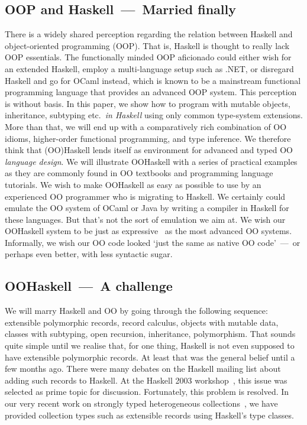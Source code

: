 
\subsection*{OOP and Haskell~---~Married finally}
There is a widely shared perception regarding the relation between
Haskell and object-oriented programming (OOP). That is, Haskell is
thought to really lack OOP essentials. The functionally minded OOP
aficionado could either wish for an extended Haskell, employ a
multi-language setup such as .NET, or disregard Haskell and go for
OCaml instead, which is known to be a mainstream functional
programming language that provides an advanced OOP system. This
perception is without basis. In this paper, we show how to program
with mutable objects, inheritance, subtyping etc.\ \emph{in Haskell}
using only common type-system extensions. More than that, we will end
up with a comparatively rich combination of OO idioms, higher-order
functional programming, and type inference. We therefore think that
(OO)Haskell lends itself as environment for advanced and typed OO
\emph{language design}. We will illustrate OOHaskell with a series of
practical examples as they are commonly found in OO textbooks and
programming language tutorials. We wish to make OOHaskell as easy as
possible to use by an experienced OO programmer who is migrating to
Haskell. We certainly could emulate the OO system of OCaml or Java by
writing a compiler in Haskell for these languages. But that's not the
sort of emulation we aim at. We wish our OOHaskell system to be just
as expressive~\cite{Felleisen90} as the most advanced OO
systems. Informally, we wish our OO code looked `just the same as
native OO code'~---~or perhaps even better, with less syntactic sugar.


\subsection*{OOHaskell~---~A challenge}

We will marry Haskell and OO by going through the following sequence:
extensible polymorphic records, record calculus, objects with mutable
data, classes with subtyping, open recursion, inheritance,
polymorphism. That sounds quite simple until we realise that, for one
thing, Haskell is not even supposed to have extensible polymorphic
records. At least that was the general belief until a few months ago.
There were many debates on the Haskell mailing list about adding such
records to Haskell. At the Haskell 2003 workshop~\cite{HW03}, this
issue was selected as prime topic for discussion. Fortunately, this
problem is resolved. In our very recent work on strongly typed
heterogeneous collections~\cite{HLIST-HW04}, we have provided
collection types such as extensible records using Haskell's type
classes.

